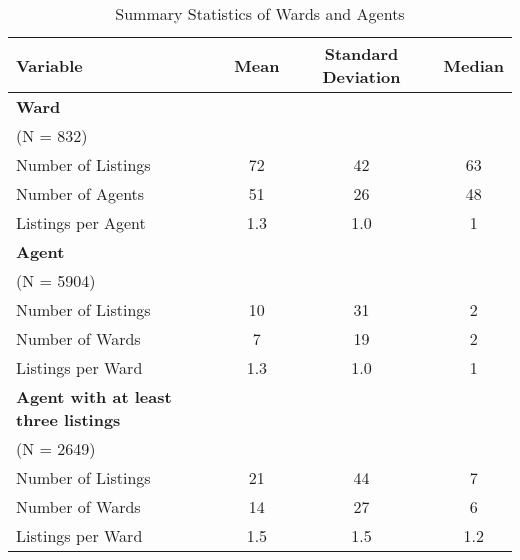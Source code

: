 \documentclass[AEJ,draftmode]{AEA}
\begin{document}
\begin{table}[ht]
    \centering
    \caption{Summary Statistics of Wards and Agents}
    \begin{tabular}{@{}lccc@{}} \toprule
        Variable                    & Mean  & Standard Deviation    & Median \\ \midrule \addlinespace
        \bf{Ward} \\\cmidrule(r{2cm}){1-1}
        (N = 832) \\
        Number of Listings          & 72    & 42                    & 63 \\
        Number of Agents            & 51    & 26                    & 48 \\
        Listings per Agent          & 1.3   & 1.0                   & 1  \\ \addlinespace
        \bf{Agent} \\\cmidrule(r{2cm}){1-1}
        (N = 5904) \\
        Number of Listings          & 10    & 31                    & 2 \\
        Number of Wards             & 7     & 19                    & 2 \\
        Listings per Ward           & 1.3   & 1.0                   & 1 \\ \addlinespace
        \bf{Agent with at least three listings} \\\cmidrule(r{2cm}){1-1}
        (N = 2649) \\
        Number of Listings          & 21    & 44                    & 7 \\
        Number of Wards             & 14    & 27                    & 6 \\
        Listings per Ward           & 1.5   & 1.5                   & 1.2 \\ \bottomrule
    \end{tabular}
\end{table}
\end{document}
